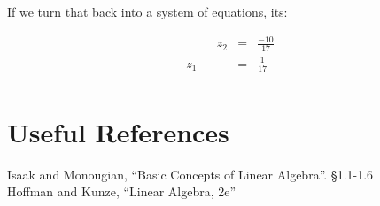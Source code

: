 If we turn that back into a system of equations, its: 

\[\begin{array}{rcrcr}
 & & z_2 & = & \frac{-10}{17}\\
 z_1 & &  & = & \frac{1}{17}\\
\end{array}\]

\section*{Useful References}
Isaak and Monougian, ``Basic Concepts of Linear Algebra''. \S 1.1-1.6\\
Hoffman and Kunze, ``Linear Algebra, 2e''


